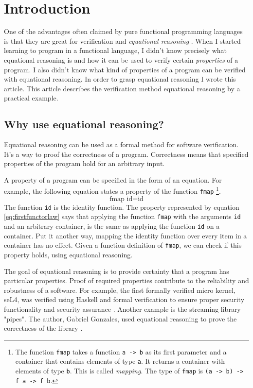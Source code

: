 \section{Introduction}
\label{sec:This}

One of the advantages often claimed by pure functional programming languages is that they are great for \gls{verification} and \emph{equational reasoning} \cite{Wadler87}.
When I started learning to program in a functional language, I didn't know precisely what equational reasoning is and how it can be used to verify certain \emph{properties} of a program. I also didn't know what kind of properties of a program can be verified with equational reasoning. In order to grasp equational reasoning I wrote this article.
This article describes the verification method equational reasoning by a practical example. 

\subsection{Why use equational reasoning?}

Equational reasoning can be used as a formal method for software verification. It's a way to proof the correctness of a program. Correctness means that specified properties of the program hold for an arbitrary input. 

A property of a program can be specified in the form of an equation. For example, the following equation states a property of the function \verb|fmap|  \footnote{The function \verb|fmap| takes a function \verb|a -> b| as its first parameter and a container that contains elements of type \verb|a|. It returns a container with elements of type \verb|b|. This is called \emph{mapping}. The type of \verb|fmap| is \verb|(a -> b) -> f a -> f b|.}.
\begin{equation}
  \label{eq:firstfunctorlaw}
\text{fmap } \text{id}  =  \text{id}  
\end{equation}
 The function \verb|id| is the identity function. The property represented by equation \ref{eq:firstfunctorlaw} says that applying the function \verb|fmap| with the arguments \verb|id| and an arbitrary container, is the same as applying the function \verb|id| on a container. Put it another way, mapping the identity function over every item in a container has no effect. Given a function definition of \verb|fmap|, we can check if this property holds, using equational reasoning.

The goal of equational reasoning is to provide certainty that a program has particular properties. Proof of required properties contribute to the reliability and robustness of a software. 
For example, the first formally verified micro kernel, seL4, was verified using Haskell and formal verification to ensure proper security functionality and security assurance \cite{Klein09}.
Another example is the streaming library "pipes". The author, Gabriel Gonzales, used equational reasoning to prove the correctness of the library \cite{gonzales13}.

